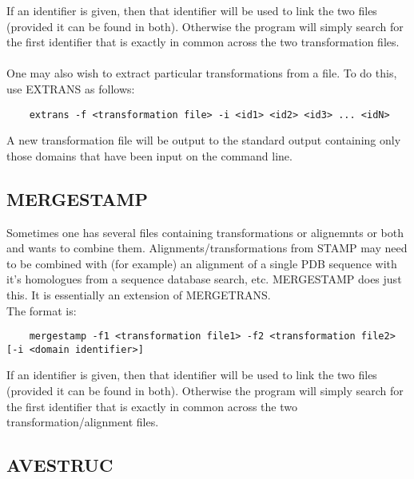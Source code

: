     If an identifier is given, then that identifier will be used to link the two files (provided it
    can be found in both).   Otherwise the program will simply search for the first identifier that 
    is exactly in common across the two transformation files.\\
    \\
    One may also wish to extract particular transformations from a file.  To do this, use EXTRANS as follows:\\

    \begin{scriptsize}\begin{verbatim}
    extrans -f <transformation file> -i <id1> <id2> <id3> ... <idN>
    \end{verbatim} \end{scriptsize}


    A new transformation file will be output to the standard output containing only those domains
    that have been input on the command line.

    \subsection{MERGESTAMP}

    Sometimes one has several files containing transformations or alignemnts or both
    and wants to combine them.  Alignments/transformations from STAMP may need to be
    combined with (for example) an alignment of a single PDB sequence with it's homologues
    from a sequence database search, etc.  MERGESTAMP does just this.  It is essentially
    an extension of MERGETRANS.\\

    The format is:\\

    \begin{scriptsize}\begin{verbatim}
    mergestamp -f1 <transformation file1> -f2 <transformation file2> [-i <domain identifier>]
    \end{verbatim} \end{scriptsize}

    If an identifier is given, then that identifier will be used to link the two files (provided it
    can be found in both).   Otherwise the program will simply search for the first identifier that 
    is exactly in common across the two transformation/alignment files.

    \subsection{AVESTRUC}

